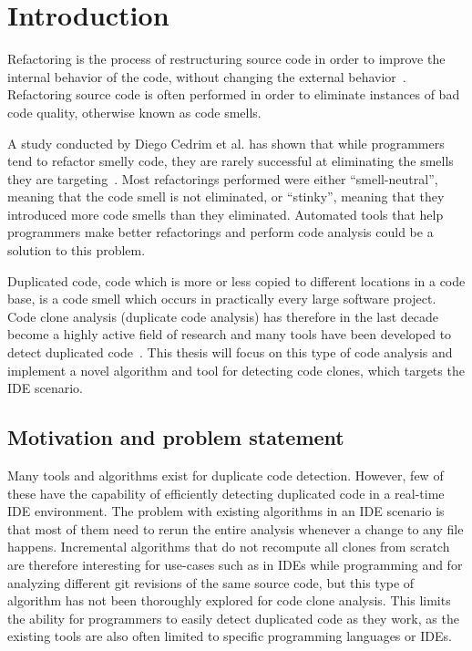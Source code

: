 \chapter{Introduction}

Refactoring is the process of restructuring source code in order to improve the internal
behavior of the code, without changing the external behavior~\cite[9]{fowlerrefactoring}.
Refactoring source code is often performed in order to eliminate instances of bad code
quality, otherwise known as code smells.

A study conducted by Diego Cedrim et al. has shown that while programmers tend to refactor
smelly code, they are rarely successful at eliminating the smells they are
targeting~\cite{Rohit_Gheyi_Impact}. Most refactorings performed were either
``smell-neutral'', meaning that the code smell is not eliminated, or ``stinky'',
meaning that they introduced more code smells than they eliminated. Automated tools that
help programmers make better refactorings and perform code analysis could be a solution to
this problem.

Duplicated code, code which is more or less copied to different locations in a code base,
is a code smell which occurs in practically every large software project. Code clone
analysis (duplicate code analysis) has therefore in the last decade become a highly active
field of research and many tools have been developed to detect duplicated
code~\cite[6]{Inoue_introduction_to_cc}. This thesis will focus on this type of code
analysis and implement a novel algorithm and tool for detecting code clones, which targets
the IDE scenario.

\section{Motivation and problem statement}

Many tools and algorithms exist for duplicate code detection. However, few of these have
the capability of efficiently detecting duplicated code in a real-time IDE environment.
The problem with existing algorithms in an IDE scenario is that most of them need to rerun
the entire analysis whenever a change to any file happens. Incremental algorithms that do
not recompute all clones from scratch are therefore interesting for use-cases such as in
IDEs while programming and for analyzing different git revisions of the same source code,
but this type of algorithm has not been thoroughly explored for code clone analysis. This
limits the ability for programmers to easily detect duplicated code as they work, as the
existing tools are also often limited to specific programming languages or IDEs.

